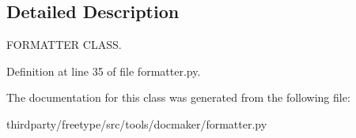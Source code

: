 \subsection{Detailed Description}
F\+O\+R\+M\+A\+T\+T\+ER C\+L\+A\+SS. 

Definition at line 35 of file formatter.\+py.



The documentation for this class was generated from the following file\+:\begin{DoxyCompactItemize}
\item 
thirdparty/freetype/src/tools/docmaker/formatter.\+py\end{DoxyCompactItemize}
